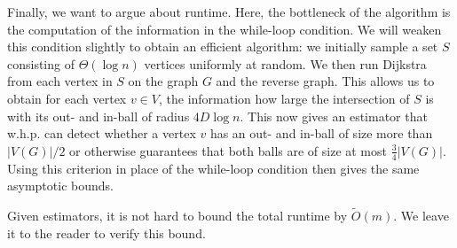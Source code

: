 Finally, we want to argue about runtime. Here, the bottleneck of the algorithm is the computation of the information in the while-loop condition. We will weaken this condition slightly to obtain an efficient algorithm: we initially sample a set $S$ consisting of $\Theta(\log n)$ vertices uniformly at random. We then run Dijkstra from each vertex in $S$ on the graph $G$ and the reverse graph. This allows us to obtain for each vertex $v \in V$, the information how large the intersection of $S$ is with its out- and in-ball of radius $4D\log n$. This now gives an estimator that w.h.p. can detect whether a vertex $v$ has an out- and in-ball of size more than $|V(G)|/2$ or otherwise guarantees that both balls are of size at most $\frac{3}{4}|V(G)|$. Using this criterion in place of the while-loop condition then gives the same asymptotic bounds.

Given estimators, it is not hard to bound the total runtime by $\tilde{O}(m)$. We leave it to the reader to verify this bound.